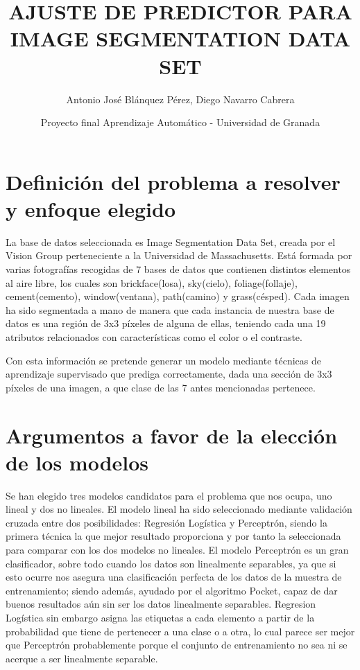 \documentclass{article}
\title{AJUSTE DE PREDICTOR PARA IMAGE SEGMENTATION DATA SET}
\author{Antonio José Blánquez Pérez, Diego Navarro Cabrera}
\date{Proyecto final Aprendizaje Automático - Universidad de Granada}
\begin{document}
 \setlength{\parskip}{1em} 

	\maketitle
	

	\section{Definición del problema a resolver y enfoque elegido}

	La base de datos seleccionada es Image Segmentation Data Set, creada por el Vision Group perteneciente a la Universidad de Massachusetts. Está formada por varias fotografías recogidas de 7 bases de datos que contienen distintos elementos al aire libre, los cuales son brickface(losa), sky(cielo), foliage(follaje), cement(cemento), window(ventana), path(camino) y grass(césped). Cada imagen ha sido segmentada a mano de manera que cada instancia de nuestra base de datos es una región de 3x3 píxeles de alguna de ellas, teniendo cada una 19 atributos relacionados con características como el color o el contraste. 
	\par
	Con esta información se pretende generar un modelo mediante técnicas de aprendizaje supervisado que prediga correctamente, dada una sección de 3x3 píxeles de una imagen, a que clase de las 7 antes mencionadas pertenece.
	
	\section{Argumentos a favor de la elección de los modelos}
	
	Se han elegido tres modelos candidatos para el problema que nos ocupa, uno lineal y dos no lineales. El modelo lineal ha sido seleccionado mediante validación cruzada entre dos posibilidades: Regresión Logística y Perceptrón, siendo la primera técnica la que mejor resultado proporciona y por tanto la seleccionada para comparar con los dos modelos no lineales. El modelo Perceptrón es un gran clasificador, sobre todo cuando los datos son linealmente separables, ya que si esto ocurre nos asegura una clasificación perfecta de los datos de la muestra de entrenamiento; siendo además, ayudado por el algoritmo Pocket, capaz de dar buenos resultados aún sin ser los datos linealmente separables. Regresion Logística sin embargo asigna las etiquetas a cada elemento a partir de la probabilidad que tiene de pertenecer a una clase o a otra, lo cual parece ser mejor que Perceptrón probablemente porque el conjunto de entrenamiento no sea ni se acerque a ser linealmente separable.
		
\end{document}
